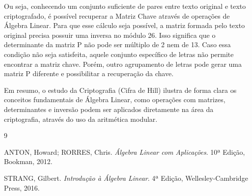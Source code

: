 \documentclass[a4paper,12pt,twocolumn]{article}
\begin{document}
Ou seja, conhecendo um conjunto suficiente de pares entre texto original e texto criptografado, é possível recuperar a Matriz Chave através de operações de Álgebra Linear. Para que esse cálculo seja possível, a matriz formada pelo texto original precisa possuir uma inversa no módulo 26. Isso significa que o determinante da matriz P não pode ser múltiplo de 2 nem de 13. Caso essa condição não seja satisfeita, aquele conjunto específico de letras não permite encontrar a matriz chave. Porém, outro agrupamento de letras pode gerar uma matriz P diferente e possibilitar a recuperação da chave.

Em resumo, o estudo da Criptografia (Cifra de Hill) ilustra de forma clara os conceitos fundamentais de Álgebra Linear, como operações com matrizes, determinantes e inversão podem ser aplicados diretamente na área da criptografia, através do uso da aritmética modular.

\begin{thebibliography}{9}

ANTON, Howard; RORRES, Chris. 
\textit{Álgebra Linear com Aplicações}. 
10ª Edição, Bookman, 2012.

STRANG, Gilbert. 
\textit{Introdução à Álgebra Linear}. 
4ª Edição, Wellesley-Cambridge Press, 2016.

\end{thebibliography}
\end{document}
